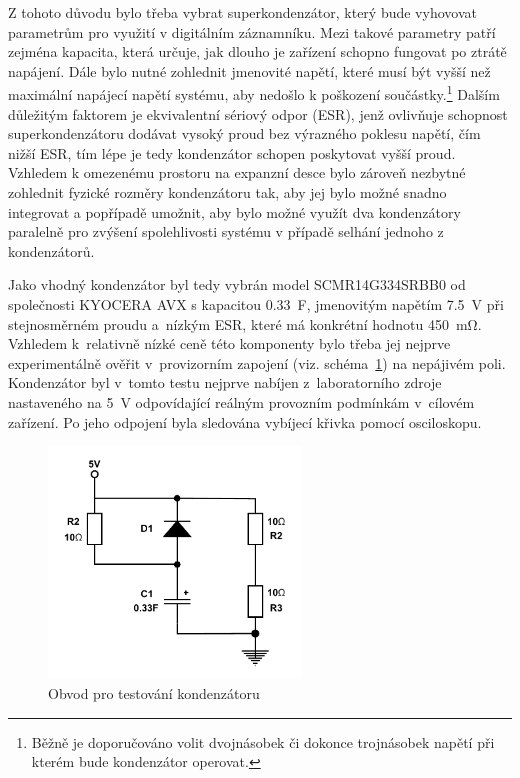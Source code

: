 Z tohoto důvodu bylo třeba vybrat superkondenzátor, který bude vyhovovat parametrům pro využití v digitálním záznamníku. Mezi takové parametry patří zejména kapacita, která určuje, jak dlouho je zařízení schopno fungovat po ztrátě napájení. Dále bylo nutné zohlednit jmenovité napětí, které musí být vyšší než maximální napájecí napětí systému, aby nedošlo k poškození součástky.\footnote{Běžně je doporučováno volit dvojnásobek či dokonce trojnásobek napětí při kterém bude kondenzátor operovat.} Dalším důležitým faktorem je ekvivalentní sériový odpor (ESR), jenž ovlivňuje schopnost superkondenzátoru dodávat vysoký proud bez výrazného poklesu napětí, čím nižší ESR, tím lépe je tedy kondenzátor schopen poskytovat vyšší proud. Vzhledem k omezenému prostoru na expanzní desce bylo zároveň nezbytné zohlednit fyzické rozměry kondenzátoru tak, aby jej bylo možné snadno integrovat a popřípadě umožnit, aby bylo možné využít dva kondenzátory paralelně pro zvýšení spolehlivosti systému v případě selhání jednoho z kondenzátorů.

Jako vhodný kondenzátor byl tedy vybrán model SCMR14G334SRBB0 od společnosti KYOCERA AVX s kapacitou \SI{0.33}{\farad}, jmenovitým napětím \SI{7.5}{\volt} při stejnosměrném proudu a~nízkým ESR, které má konkrétní hodnotu \SI{450}{\milli\ohm}. Vzhledem k~relativně nízké ceně této komponenty bylo třeba jej nejprve experimentálně ověřit v~provizorním zapojení (viz. schéma~\ref{fig:test-capacitors}) na nepájivém poli. Kondenzátor byl v~tomto testu nejprve nabíjen z~laboratorního zdroje nastaveného na \SI{5}{\volt} odpovídající reálným provozním podmínkám v~cílovém zařízení. Po jeho odpojení byla sledována vybíjecí křivka pomocí osciloskopu.

\begin{figure}[h]
    \centering
    \includegraphics[width=0.60\textwidth]{obrazky-figures/test_capacitors.pdf}
    
    \caption{Obvod pro testování kondenzátoru}
    \label{fig:test-capacitors}
\end{figure}

